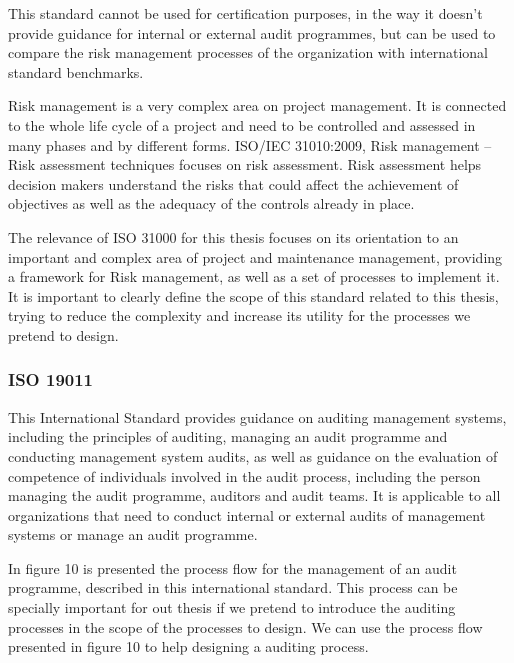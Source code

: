 This standard cannot be used for certification purposes, in the way it doesn't provide guidance for internal or external audit programmes, but can be used to compare the risk management processes of the organization with international standard benchmarks.\par
Risk management is a very complex area on project management. It is connected to the whole life cycle of a project and need to be controlled and assessed in many phases and by different forms. ISO/IEC 31010:2009, Risk management – Risk assessment techniques focuses on risk assessment. Risk assessment helps decision makers understand the risks that could affect the achievement of objectives as well as the adequacy of the controls already in place.\par
The relevance of ISO 31000 for this thesis focuses on its orientation to an important and complex area of project and maintenance management, providing a framework for Risk management, as well as a set of processes to implement it. It is important to clearly define the scope of this standard related to this thesis, trying to reduce the complexity and increase its utility for the processes we pretend to design.


\subsubsection{ISO 19011}

This International Standard provides guidance on auditing management systems, including the principles of auditing, managing an audit programme and conducting management system audits, as well as guidance on the evaluation of competence of individuals involved in the audit process, including the person managing the audit programme, auditors and audit teams. It is applicable to all organizations that need to conduct internal or external audits of management systems or manage an audit programme.\par
In figure 10 is presented the process flow for the management of an audit programme, described in this international standard. This process can be specially important for out thesis if we pretend to introduce the auditing processes in the scope of the processes to design. We can use the process flow presented in figure 10 to help designing a auditing process.


